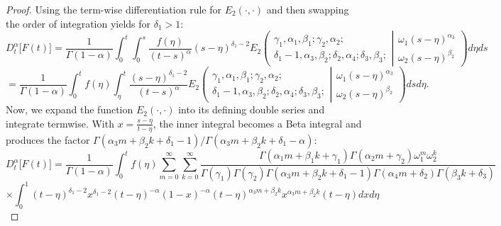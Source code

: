 \documentclass[10pt,a4paper]{amsart}
\begin{document}
\begin{proof}
Using the term-wise differentiation rule for $E_2(\cdot,\cdot)$ and then swapping the order of integration yields for $\delta_1>1$:
\begin{equation*}
     D_t^\alpha\big[F(t)\big]=\frac{1}{\Gamma(1-\alpha)}\int_0^t \int_0^s \frac{f(\eta)}{(t-s)^\alpha}(s-\eta)^{\delta_1-2 }E_2\left(\begin{array}{c}
\gamma_1,\alpha_1, \beta_1 ; \gamma_2, \alpha_2 ; \\
\delta_1-1, \alpha_3, \beta_2 ;\delta_2, \alpha_4; \delta_3, \beta_3 ; 
\end{array} \left| 
\begin{array}{c}
\omega_1 (s-\eta)^{\alpha_3} \\
\omega_2 (s-\eta)^{\beta_2} 
\end{array} 
\right.
\right)d\eta ds
\end{equation*}
\begin{equation*}
 =\frac{1}{\Gamma(1-\alpha)}\int_0^t f(\eta) \int_\eta^t \frac{(s-\eta)^{\delta_1-2}}{(t-s)^\alpha} E_2\left(\begin{array}{c}
\gamma_1,\alpha_1, \beta_1 ; \gamma_2, \alpha_2 ; \\
\delta_1-1, \alpha_3, \beta_2 ;\delta_2, \alpha_4; \delta_3, \beta_3 ; 
\end{array} \left| 
\begin{array}{c}
\omega_1 (s-\eta)^{\alpha_3} \\
\omega_2 (s-\eta)^{\beta_2} 
\end{array} 
\right.
\right)ds d\eta. 
\end{equation*}
Now, we expand  the function $E_2(\cdot,\cdot)$ into its defining double series and integrate termwise. With
$x=\frac{s-\eta}{t-\eta}$, the inner integral becomes a Beta integral and produces the factor
$\Gamma(\alpha_3 m+\beta_2 k+\delta_1-1)/\Gamma(\alpha_3 m+\beta_2 k+\delta_1-\alpha)$:
\begin{equation*}
    D_t^\alpha\big[F(t)\big]=\frac{1}{\Gamma(1-\alpha)} \int_0^t f(\eta) \sum_{m=0}^\infty \sum_{k=0}^\infty \frac{\Gamma(\alpha_1 m+\beta_1 k+\gamma_1)\Gamma(\alpha_2 m+\gamma_2) \omega_1^m \omega_2^k}{\Gamma(\gamma_1)\Gamma(\gamma_2)\Gamma(\alpha_3 m+\beta_2 k+\delta_1-1)\Gamma(\alpha_4 m+\delta_2)\Gamma(\beta_3 k+ \delta_3)}
\end{equation*}
\begin{equation*}
    \times\int_0^1 (t-\eta)^{\delta_1-2} x^{\delta_1-2} (t-\eta)^{-\alpha}(1-x)^{-\alpha}(t-\eta)^{\alpha_3 m+\beta_2 k}x^{\alpha_3 m+\beta_2 k} (t-\eta) dx d\eta
\end{equation*}


\end{proof}
\end{document}
